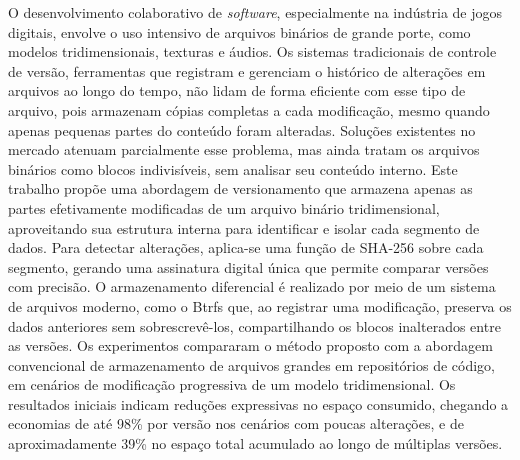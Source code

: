 
\begin{resumoutfpr}
O desenvolvimento colaborativo de \textit{software}, especialmente na indústria de jogos digitais, envolve o uso intensivo de arquivos binários de grande porte, como modelos tridimensionais, texturas e áudios. Os sistemas tradicionais de controle de versão, ferramentas que registram e gerenciam o histórico de alterações em arquivos ao longo do tempo, não lidam de forma eficiente com esse tipo de arquivo, pois armazenam cópias completas a cada modificação, mesmo quando apenas pequenas partes do conteúdo foram alteradas. Soluções existentes no mercado atenuam parcialmente esse problema, mas ainda tratam os arquivos binários como blocos indivisíveis, sem analisar seu conteúdo interno. Este trabalho propõe uma abordagem de versionamento que armazena apenas as partes efetivamente modificadas de um arquivo binário tridimensional, aproveitando sua estrutura interna para identificar e isolar cada segmento de dados. Para detectar alterações, aplica-se uma função de SHA-256 sobre cada segmento, gerando uma assinatura digital única que permite comparar versões com precisão. O armazenamento diferencial é realizado por meio de um sistema de arquivos moderno, como o Btrfs que, ao registrar uma modificação, preserva os dados anteriores sem sobrescrevê-los, compartilhando os blocos inalterados entre as versões. Os experimentos compararam o método proposto com a abordagem convencional de armazenamento de arquivos grandes em repositórios de código, em cenários de modificação progressiva de um modelo tridimensional. Os resultados iniciais indicam reduções expressivas no espaço consumido, chegando a economias de até 98\% por versão nos cenários com poucas alterações, e de aproximadamente 39\% no espaço total acumulado ao longo de múltiplas versões.
\end{resumoutfpr}
